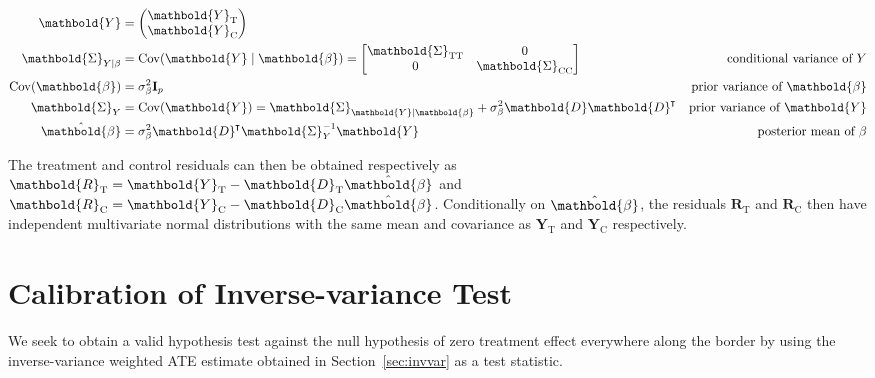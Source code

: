 \documentclass[letter]{article}
\DeclarePairedDelimiter{\parenthesis}{\lparen}{\rparen}
\newcommand{\del}[1]{\parenthesis*{#1}}
\DeclareMathOperator{\cov}{{Cov}}
\newcommand*{\trans}{^{\mkern-1.5mu\intercal}}
\newcommand{\treat}{\mathrm{T}}
\newcommand{\ctrol}{\mathrm{C}}
\newcommand{\sigmabeta}{\sigma_{\beta}}
\newcommand{\Yvec}{\mathbold{Y}}
\newcommand{\yt}{\Yvec_{\treat}}
\newcommand{\yc}{\Yvec_{\ctrol}}
\newcommand{\betavec}{\mathbold{\beta}}
\newcommand{\residvec}{\mathbold{R}}
\newcommand{\eye}{\mathbf{I}}
\newcommand{\Dmat}{\mathbold{D}}
\newcommand{\SigmaMat}{\mathbold{\Sigma}}
\newcommand{\STT}{\SigmaMat_{\treat \treat}}
\newcommand{\SCC}{\SigmaMat_{\ctrol \ctrol}}
\begin{document}
    	\begin{equation}
\begin{aligned}
    \Yvec &= \begin{pmatrix}
            \yt \\
            \yc
        \end{pmatrix}
        \\
    \SigmaMat_{Y \mid \beta} &= \cov\del{\Yvec \mid \betavec }
        = \begin{bmatrix}
            \STT & 0 \\
            0 & \SCC
          \end{bmatrix}
        & \text{conditional variance of $Y$} \\
    \cov\del{\betavec} &= \sigmabeta^2 \eye_p
        & \text{prior variance of $\betavec$} \\
    \SigmaMat_Y &= \cov\del{\Yvec} 
            = \SigmaMat_{\Yvec \mid \betavec} 
              + \sigmabeta^2 \Dmat \Dmat\trans
        & \text{prior variance of $\Yvec$} \\
    \hat\betavec &= \sigmabeta^2 \Dmat\trans\SigmaMat_{Y}^{-1} \Yvec
        & \text{posterior mean of $\beta$}
\end{aligned}
\end{equation}
    


    	The treatment and control residuals can then be obtained respectively as \(\residvec_\treat = \yt - \Dmat_\treat \hat\betavec\) and \(\residvec_\ctrol = \yc - \Dmat_\ctrol \hat\betavec\).
Conditionally on \(\hat\betavec\), the residuals \(\residvec_\treat\) and \(\residvec_\ctrol\) then have independent multivariate normal distributions with the same mean and covariance as \(\yt\) and \(\yc\) respectively.
    


    	\hypertarget{calibration-of-inverse-variance-test}{%
\section{Calibration of Inverse-variance Test}\label{calibration-of-inverse-variance-test}}
    


    	\label{sec:calibration}
    


    	We seek to obtain a valid hypothesis test against the null hypothesis of zero treatment effect everywhere along the border by using the inverse-variance weighted ATE estimate obtained in Section~\ref{sec:invvar} as a test statistic.
    
\end{document}
